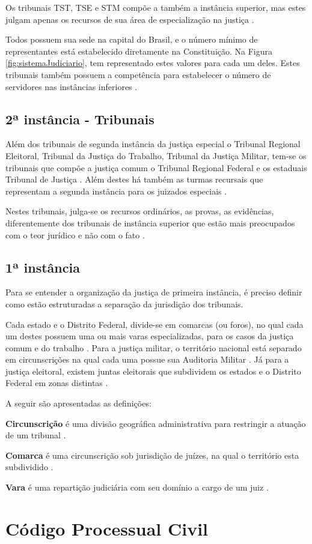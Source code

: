 Os tribunais TST, TSE e STM compõe a também a instância superior, mas estes julgam apenas os recursos de sua área de especialização na justiça \cite{BRASIL1988}.

Todos possuem sua sede na capital do Brasil, e o número mínimo de representantes está estabelecido diretamente na Constituição. Na Figura \ref{fig:sistemaJudiciario}, tem representado estes valores para cada um deles. Estes tribunais também possuem a competência para estabelecer o número de servidores nas instâncias inferiores \cite{BRASIL1988}.

\subsection{2ª instância - Tribunais}

Além dos tribunais de segunda instância da justiça especial o Tribunal Regional Eleitoral, Tribunal da Justiça do Trabalho, Tribunal da Justiça Militar, tem-se os tribunais que compõe a justiça comum o Tribunal Regional Federal e os estaduais Tribunal de Justiça \cite{BRASIL1988}. Além destes há também as turmas recursais que representam a segunda instância para os juizados especiais \cite{BRASIL2012}.

Nestes tribunais, julga-se os recursos ordinários, as provas, as evidências, diferentemente dos tribunais de instância superior que estão mais preocupados com o teor jurídico e não com o fato \cite{JUNIOR2012}.

\subsection{1ª instância}

Para se entender a organização da justiça de primeira instância, é preciso definir como estão estruturadas a separação da jurisdição dos tribunais.

Cada estado e o Distrito Federal, divide-se em comarcas (ou foros), no qual cada um destes possuem uma ou mais varas especializadas, para os casos da justiça comum e do trabalho \cite{JUNIOR2012}. Para a justiça militar, o território nacional está separado em circunscrições na qual cada uma possue sua Auditoria Militar \cite{BRASIL1992}. Já para a justiça eleitoral, existem juntas eleitorais que subdividem os estados e o Distrito Federal em zonas distintas \cite{BRASIL1988}.

A seguir são apresentadas as definições:

\begin{description}
	\item \textbf{Circunscrição} é uma divisão geográfica administrativa para restringir a atuação de um tribunal \cite[p. 71]{GUIMARAES2012}.
	\item \textbf{Comarca} é uma circunscrição sob jurisdição de juízes, na qual o território esta subdividido \cite[p. 75]{GUIMARAES2012}.
    \item \textbf{Vara} é uma repartição judiciária com seu domínio a cargo de um juiz \cite[p. 259]{GUIMARAES2012}.
\end{description}
\section{Código Processual Civil}